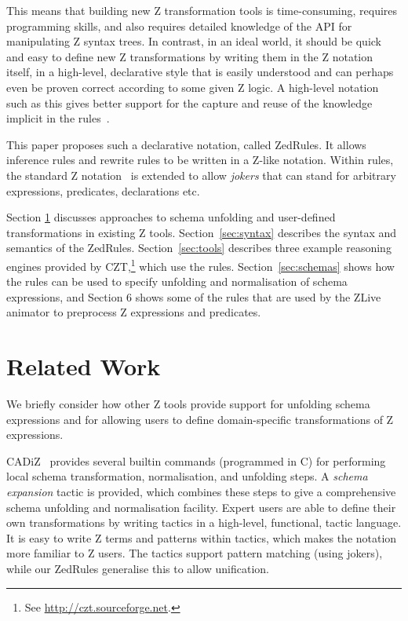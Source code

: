 \documentclass{entcs}
\begin{document}
This means that building new Z transformation tools is time-consuming,
requires programming skills, and also requires detailed knowledge of the
API for manipulating Z syntax trees.  In contrast, in an ideal world, it
should be quick and easy to define new Z transformations by writing them in
the Z notation itself, in a high-level, declarative style that is easily
understood and can perhaps even be proven correct according to some given Z
logic.  A high-level notation such as this gives better support for the
capture and reuse of the knowledge implicit in the
rules~\cite{armour:business-model00}.

This paper proposes such a declarative notation, called ZedRules.  It
allows inference rules and rewrite rules to be written in a Z-like
notation.  Within rules, the standard Z notation~\cite{ISOZ} is extended to
allow \emph{jokers} that can stand for arbitrary expressions, predicates,
declarations etc.

Section \ref{sec:relwork} discusses approaches to schema unfolding and
user-defined transformations in existing Z tools.
Section~\ref{sec:syntax} describes the syntax and semantics of the
ZedRules.  Section~\ref{sec:tools} describes three example reasoning
engines provided by CZT,\footnote{See
\url{http://czt.sourceforge.net}.} which use the rules.
Section~\ref{sec:schemas} shows how the rules can be used to specify
unfolding and normalisation of schema expressions,
and Section 6 shows some of the rules
that are used by the ZLive animator \cite{ZLive}
to preprocess Z expressions and predicates.


\section{Related Work} \label{sec:relwork}

We briefly consider how other Z tools provide support for unfolding
schema expressions and for allowing users to define domain-specific
transformations of Z expressions.

CADiZ~\cite{cadiz:refman02} provides several builtin commands (programmed
in C) for performing local schema transformation, normalisation, and
unfolding steps.  A \emph{schema expansion} tactic is provided, which
combines these steps to give a comprehensive schema unfolding and
normalisation facility.  Expert users are able to define their own
transformations by writing tactics in a high-level, functional, tactic
language.  It is easy to write Z terms and patterns within tactics, which
makes the notation more familiar to Z users.  The tactics support pattern
matching (using jokers), while our ZedRules generalise this to allow
unification.
\end{document}
